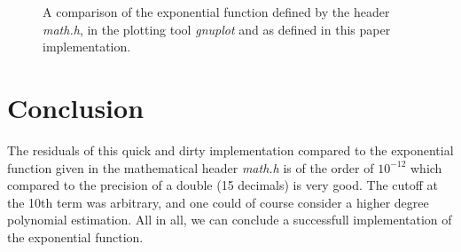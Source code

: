 \documentclass[a4paper, twocolumn, 11pt, oneside]{memoir}
\begin{document}
\begin{figure}[ht]
\centering

\caption{A comparison of the exponential function defined by the header
\textsl{math.h}, in the plotting tool \textsl{gnuplot} and as defined in this
paper implementation.}
\label{fig:exp.tex}
\end{figure}

\section{Conclusion}
The residuals of this quick and dirty implementation compared to the
exponential function given in the mathematical header \textsl{math.h} is of the
order of $10^{-12}$ which compared to the precision of a double (15 decimals)
is very good. The cutoff at the 10th term was arbitrary, and one could of
course consider a higher degree polynomial estimation. All in all, we
can conclude a successfull implementation of the exponential function.

\printbibliography
\end{document}
